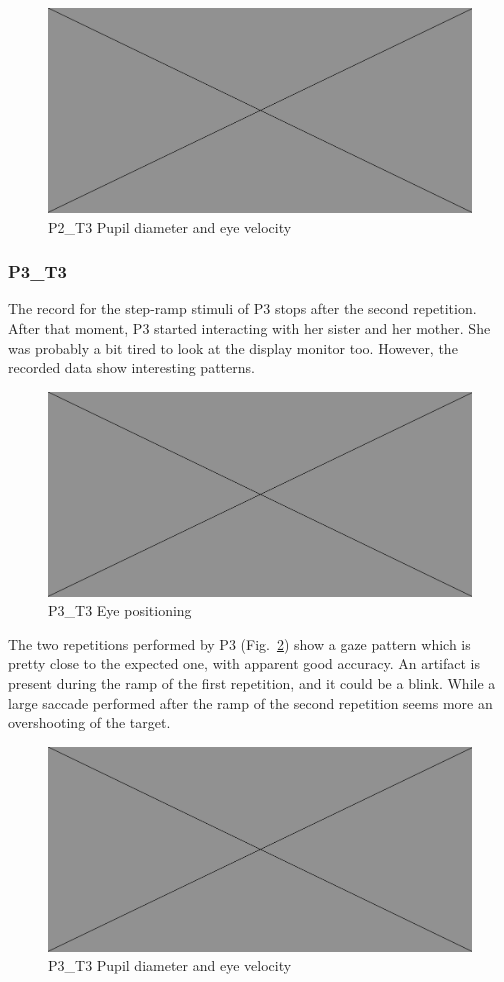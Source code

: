 \begin{figure}[h]
  \centering
  \includegraphics[width=.5\textwidth]{figures/placeholderImg.jpg}
  \caption[P2\_T3 pupil velocity]{P2\_T3 Pupil diameter and eye velocity}
  \label{fig:P2_T3_vel}
\end{figure}


\subsubsection{P3\_T3}
\label{sec:P3_T3}

The record for the step-ramp stimuli of P3 stops after the second repetition. After that moment, P3 started interacting with her sister and her mother. She was probably a bit tired to look at the display monitor too. However, the recorded data show interesting patterns.

\begin{figure}[h]
  \centering
  \includegraphics[width=.5\textwidth]{figures/placeholderImg.jpg}
  \caption[P3\_T3 Eye positioning]{P3\_T3 Eye positioning}
  \label{fig:P3_T3_pos}
\end{figure}

The two repetitions performed by P3 (Fig.~\ref{fig:P3_T3_pos})  show a gaze pattern which is pretty close to the expected one, with apparent good accuracy. An artifact is present during the ramp of the first repetition, and it could be a blink. While a large saccade performed after the ramp of the second repetition seems more an overshooting of the target.

\begin{figure}[h]
  \centering
  \includegraphics[width=.5\textwidth]{figures/placeholderImg.jpg}
  \caption[P3\_T3 pupil velocity]{P3\_T3 Pupil diameter and eye velocity}
  \label{fig:P3_T3_vel}
\end{figure}

